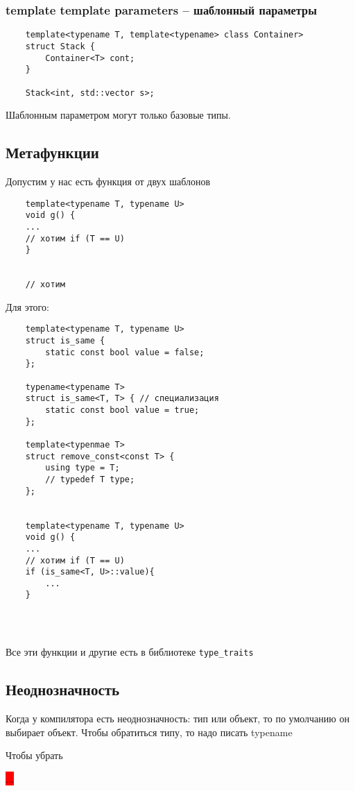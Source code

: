 \documentclass[12pt]{article}
\begin{document}
\subsubsection{template template parameters --  шаблонный параметры}

\begin{lstlisting}
	template<typename T, template<typename> class Container>
	struct Stack {
		Container<T> cont;
	}
	
	Stack<int, std::vector s>;
\end{lstlisting}

Шаблонным параметром могут только базовые типы. 

\subsection{Метафункции}

Допустим у нас есть функция от двух шаблонов

\begin{lstlisting}
	template<typename T, typename U>
	void g() {
	...
	// хотим if (T == U)
	}
	
	
	// хотим 
\end{lstlisting}

Для этого:

\begin{lstlisting}
	template<typename T, typename U>
	struct is_same {
		static const bool value = false;
	};
	
	typename<typename T>
	struct is_same<T, T> { // специализация
		static const bool value = true;
	};
	
	template<typenmae T>
	struct remove_const<const T> {
		using type = T;
		// typedef T type;
	};
	
	
	template<typename T, typename U>
	void g() {
	...
	// хотим if (T == U)
	if (is_same<T, U>::value){
		...
	}
	
	
	
\end{lstlisting}

Все эти функции и другие есть в библиотеке \texttt{type\_traits}

\subsection{Неоднозначность}

Когда у компилятора есть неоднозначность: тип или объект, то по умолчанию он выбирает объект. Чтобы обратиться типу, то надо писать typename

Чтобы убрать 

\colorbox{red}{...}
\end{document}
